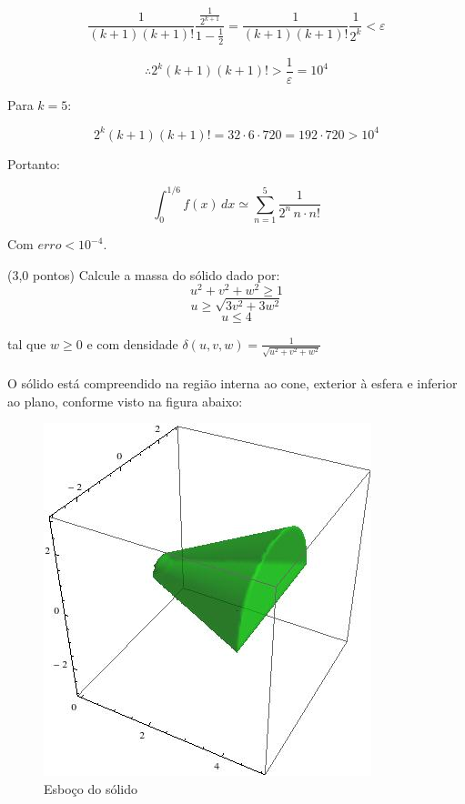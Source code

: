 \documentclass[12pt,a4paper]{article}
\begin{document}
\begin{itemize}
$$ \frac{1}{(k+1)(k+1)!} \frac{ \frac{1}{2^{k+1}} }{1 - \frac{1}{2}} = \frac{1}{(k+1)(k+1)!} \frac{1}{2^k} < \varepsilon  $$

$$ \therefore 2^k (k+1)(k+1)! > \frac{1}{\varepsilon} = 10^4 $$

Para $k = 5$:

$$ 2^k (k+1)(k+1)! = 32 \cdot 6 \cdot 720 = 192 \cdot 720 > 10^4 $$

Portanto: 

$$ \int_{0}^{1/6} f(x) \, dx  \simeq \sum_{n=1}^5 \frac{1}{ 2^n \, n \cdot n!}  $$

Com $erro < 10^{-4}$.

\end{itemize}



\newpage
{}
(3,0 pontos) Calcule a massa do sólido dado por:
$$u^2+v^2+w^2 \geq 1$$
$$u \geq \sqrt{3v^2+3w^2}$$
$$u\leq 4$$

tal que $w\geq 0$ e com densidade $\displaystyle{\delta(u,v,w)=\frac{1}{\sqrt{u^2+v^2+w^2}}}$\\
\\

O sólido está compreendido na região interna ao cone, exterior à esfera e inferior ao plano, conforme visto na figura abaixo:

\begin{figure}[h!]
	\centering
	\includegraphics[scale=0.5]{Q3A.jpg}  
	\caption{Esboço do sólido}
	\label{fig:figura6}
\end{figure}
\end{document}
